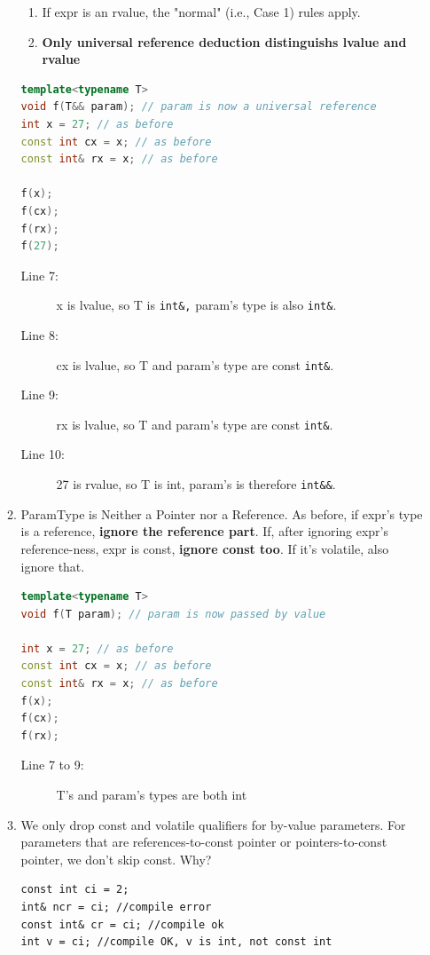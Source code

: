 \documentclass[a4paper,11pt,twoside]{book}
\begin{document}
\begin{itemize}
\begin{enumerate}
\begin{enumerate}
		\item If expr is an rvalue, the "normal" (i.e., Case 1) rules apply.
		
		\item \textbf{Only universal reference deduction distinguishs lvalue and rvalue}
	\end{enumerate}
	
\begin{lstlisting}[frame=single, language=c++]
template<typename T>
void f(T&& param); // param is now a universal reference
int x = 27; // as before
const int cx = x; // as before
const int& rx = x; // as before
	
f(x); 
f(cx); 
f(rx); 
f(27); 
\end{lstlisting}
\begin{description}
	\item[Line 7:]  x is lvalue, so T is \texttt{int\&,} param's type is also \texttt{int\&}.
	\item[Line 8:]  cx is lvalue, so T  and param's type are const \texttt{int\&}.
	\item[Line 9:] rx is lvalue, so T  and param's type are const \texttt{int\&}.
	\item[Line 10:] 27 is rvalue, so T is int, param's is therefore \texttt{int\&\&}.
\end{description}
	
	\item ParamType is Neither a Pointer nor a Reference. As before, if expr's type is a reference, \textbf{ignore the reference part}. If, after ignoring expr's reference-ness, expr is const, \textbf{ignore const too}. If it's volatile, also ignore that.
\begin{lstlisting}[frame=single, language=c++]
template<typename T>
void f(T param); // param is now passed by value
	
int x = 27; // as before
const int cx = x; // as before
const int& rx = x; // as before
f(x); 
f(cx); 
f(rx); 
\end{lstlisting}
\begin{description}
	\item[Line 7 to 9:] T's and param's types are both int
\end{description}
	
	\item We only drop const and volatile qualifiers for by-value parameters. For parameters that are references-to-const pointer or pointers-to-const pointer, we don't skip const. Why?
\begin{lstlisting}
const int ci = 2;
int& ncr = ci; //compile error
const int& cr = ci; //compile ok
int v = ci; //compile OK, v is int, not const int
\end{lstlisting}
	

\end{enumerate}
\end{itemize}
\end{document}
